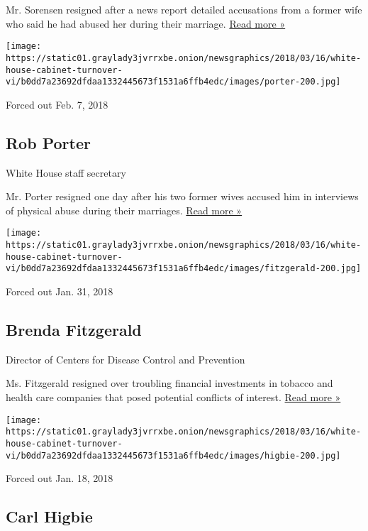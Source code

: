 Mr. Sorensen resigned after a news report detailed accusations from a
former wife who said he had abused her during their marriage.
\href{https://www.nytimes3xbfgragh.onion/2018/02/09/us/politics/david-sorensen-trump-abuse.html}{Read
more »}

\texttt{[image: https://static01.graylady3jvrrxbe.onion/newsgraphics/2018/03/16/white-house-cabinet-turnover-vi/b0dd7a23692dfdaa1332445673f1531a6ffb4edc/images/porter-200.jpg]}

Forced out Feb. 7, 2018

\hypertarget{rob-porter}{%
\subsection{Rob Porter}\label{rob-porter}}

White House staff secretary

Mr. Porter resigned one day after his two former wives accused him in
interviews of physical abuse during their marriages.
\href{https://www.nytimes3xbfgragh.onion/2018/02/07/us/politics/rob-porter-resigns-abuse-white-house-staff-secretary.html}{Read
more »}

\texttt{[image: https://static01.graylady3jvrrxbe.onion/newsgraphics/2018/03/16/white-house-cabinet-turnover-vi/b0dd7a23692dfdaa1332445673f1531a6ffb4edc/images/fitzgerald-200.jpg]}

Forced out Jan. 31, 2018

\hypertarget{brenda-fitzgerald}{%
\subsection{Brenda Fitzgerald}\label{brenda-fitzgerald}}

Director of Centers for Disease Control and Prevention

Ms. Fitzgerald resigned over troubling financial investments in tobacco
and health care companies that posed potential conflicts of interest.
\href{https://www.nytimes3xbfgragh.onion/2018/01/31/health/cdc-brenda-fitzgerald-resigns.html}{Read
more »}

\texttt{[image: https://static01.graylady3jvrrxbe.onion/newsgraphics/2018/03/16/white-house-cabinet-turnover-vi/b0dd7a23692dfdaa1332445673f1531a6ffb4edc/images/higbie-200.jpg]}

Forced out Jan. 18, 2018

\hypertarget{carl-higbie}{%
\subsection{Carl Higbie}\label{carl-higbie}}

